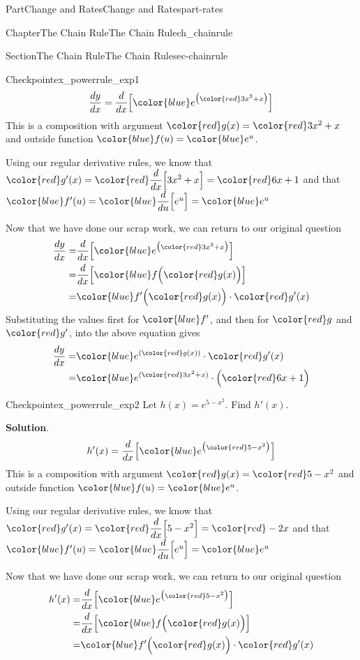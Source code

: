 \documentclass{tufte-book}
\newcommand{\blocktitlefont}{\relax}
\numberwithin{equation}{chapter}
\newcommand{\red}[1]{   {\color{red}   #1}   }
\newcommand{\blue}[1]{  {\color{blue}  #1}  }
\newcommand{\ddx}[1]{ \dfrac{d}{dx} \Big[ #1 \Big]  }
\newcommand{\ddu}[1]{ \dfrac{d}{du} \Big[ #1 \Big]  }
\newcommand{\amp}{&}
\begin{document}
\begin{partptx}{Part}{Change and Rates}{}{Change and Rates}{}{}{part-rates}
\begin{chapterptx}{Chapter}{The Chain Rule}{}{The Chain Rule}{}{}{ch_chainrule}
\begin{sectionptx}{Section}{The Chain Rule}{}{The Chain Rule}{}{}{sec-chainrule}
\begin{inlineexercise}{Checkpoint}{}{ex_powerrule_exp1}
\begin{equation*}
\frac{dy}{dx} = \ddx{\blue{ e^{\big(\red{3x^2+x}\big)} } } 
\end{equation*}
This is a composition with argument \(\red{g(x)} = \red{3x^2+x}\) and outside function \(\blue{f(u)} = \blue{ e^u }\).%
\par
Using our regular derivative rules, we know that \(\red{g'(x)} = \red{ \ddx{3x^2 +x} } = \red{6x+1} \) and that \(\blue{f'(u)} = \blue{\ddu{ e^u }} = \blue{e^u} \)%
\par
Now that we have done our scrap work, we can return to our original question%
\begin{align*}
\frac{dy}{dx} = \amp \ddx{\blue{ e^{\big(\red{3x^2+x}\big)} } }  \\
= \amp \ddx{ \blue{f\Big( \red{g(x)} \Big) } }\\
= \amp \blue{f'\Big( \red{g(x)}\Big)}\cdot \red{g'(x)}
\end{align*}
Substituting the values first for \(\blue{f'}\), and then for  \(\red{g}\) and \(\red{g'}\), into the above equation gives%
\begin{align*}
\frac{dy}{dx} = \amp \blue{ e^{(\red{g(x)})} }\cdot \red{g'(x)}\\
= \amp \blue{ e^{(\red{3x^2+x})} }\cdot \Big(\red{6x+1}\Big)
\end{align*}
%
\end{inlineexercise}%
\begin{inlineexercise}{Checkpoint}{}{ex_powerrule_exp2}%
Let \(h(x) = e^{5-x^2}\).  Find \(h'(x)\).%
\par\smallskip%
\noindent\textbf{\blocktitlefont Solution}.\hypertarget{ex_powerrule_exp2-2}{}\quad{}%
\begin{equation*}
h'(x) = \ddx{ \blue{ e^{\big( \red{5-x^2} \big)} } }
\end{equation*}
This is a composition with argument \(\red{g(x)} = \red{5-x^2}\) and outside function \(\blue{f(u)} = \blue{ e^u }\).%
\par
Using our regular derivative rules, we know that \(\red{g'(x)} 
= \red{ \ddx{5-x^2} } = \red{-2x} \) and that \(\blue{f'(u)} 
= \blue{\ddu{ e^u }} = \blue{e^u} \)%
\par
Now that we have done our scrap work, we can return to our original question%
\begin{align*}
h'(x) = \amp 
\ddx{\blue{ e^{\big(\red{5-x^2}\big)} } }  \\
= \amp \ddx{ \blue{f\Big( \red{g(x)} \Big) } }\\
= \amp \blue{f'\Big( \red{g(x)}\Big)}\cdot \red{g'(x)}

\end{align*}
\end{inlineexercise}
\end{sectionptx}
\end{chapterptx}
\end{partptx}
\end{document}
